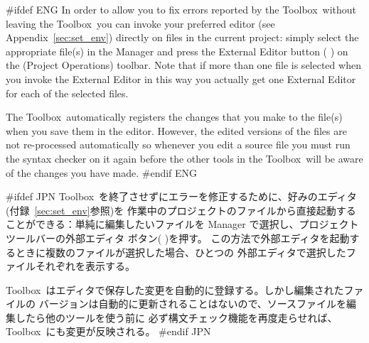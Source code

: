 \documentclass[\pformat,12pt]{article}
\newcommand{\Toolbox}{Toolbox}
\newcommand{\Toolbox}{Toolbox}
\newcommand{\guicmd}[1]{{\sf #1}}
\newcommand{\guicmd}[1]{{\gt #1}}
\begin{document}
#ifdef ENG
In order to allow you to fix errors reported by the \Toolbox\ without
leaving the \Toolbox\ you can invoke your preferred editor (see
Appendix~\ref{sec:set_env}) directly on files in the current project:
simply select the appropriate file(s) in the \guicmd{Manager} and
press the \guicmd{External Editor} button (%
) 
on the (\guicmd{Project Operations}) toolbar. Note that if more than
one file is selected when you invoke the \guicmd{External Editor} in
this way you actually get one \guicmd{External Editor} for each of the
selected files.

The \Toolbox\ automatically registers the changes that you make to the
file(s) when you save them in the editor. However, the edited versions
of the files are not re-processed automatically so whenever you edit a
source file you must run the syntax checker on it again before the
other tools in the \Toolbox\ will be aware of the changes you have
made.
#endif ENG

#ifdef JPN
\Toolbox\ を終了させずにエラーを修正するために、好みのエディタ(付録~\ref{sec:set_env}参照)を
作業中のプロジェクトのファイルから直接起動することができる：単純に編集したいファイルを
\guicmd{Manager} で選択し、\guicmd{プロジェクト}ツールバーの\guicmd{外部エディタ}
 ボタン(%
)を押す。
この方法で\guicmd{外部エディタ}を起動するときに複数のファイルが選択した場合、ひとつの
\guicmd{外部エディタ}で選択したファイルそれぞれを表示する。

\Toolbox\ はエディタで保存した変更を自動的に登録する。しかし編集されたファイルの
バージョンは自動的に更新されることはないので、ソースファイルを編集したら他のツールを使う前に
必ず構文チェック機能を再度走らせれば、\Toolbox\ にも変更が反映される。
#endif JPN


\end{document}
